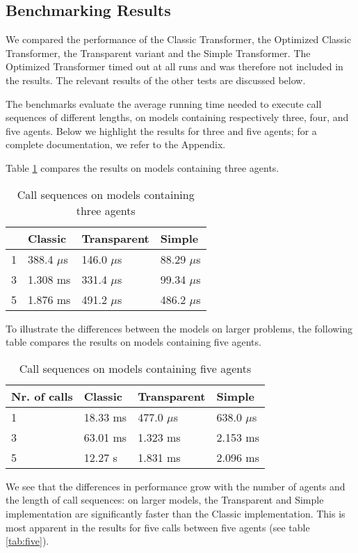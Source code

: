 \subsection{Benchmarking Results}

We compared the performance of the Classic Transformer, the Optimized Classic Transformer, the Transparent variant and the Simple Transformer. The Optimized Transformer timed out at all runs and was therefore not included in the results. The relevant results of the other tests are discussed below. 

The benchmarks evaluate the average running time needed to execute call sequences of different lengths, on models containing respectively three, four, and five agents. Below we highlight the results for three and five agents; for a complete documentation, we refer to the Appendix. 

Table \ref{tab:three} compares the results on models containing three agents. 

\begin{table}[H]
\caption {Call sequences on models containing three agents} \label{tab:three} 
\begin{center}
\begin{tabular}{l|lll}
\title 
Nr. of calls & Classic      & Transparent  & Simple       \\ \hline
1            & 388.4 $\mu$s & 146.0 $\mu$s & 88.29 $\mu$s \\
3            & 1.308 ms     & 331.4 $\mu$s & 99.34 $\mu$s \\
5            & 1.876 ms     & 491.2 $\mu$s & 486.2 $\mu$s
\end{tabular}
\end{center}
\end{table}

To illustrate the differences between the models on larger problems, the following table compares the results on models containing five agents. 

\begin{table}[H]
\caption {Call sequences on models containing five agents} \label{tab:five}  
\begin{center}
\begin{tabular}{l|lll}\label{tab:2}
    Nr. of calls & Classic  & Transparent  & Simple       \\ \hline
    1            & 18.33 ms & 477.0 $\mu$s & 638.0 $\mu$s \\
    3            & 63.01 ms & 1.323 ms     & 2.153 ms     \\
    5            & 12.27 s  & 1.831 ms     & 2.096 ms    
\end{tabular}
\end{center}
\end{table}

We see that the differences in performance grow with the number of agents and the length of call sequences: 
on larger models, the Transparent and Simple implementation are significantly faster than the Classic implementation.
This is most apparent in the results for five calls between five agents (see table \ref{tab:five}). 


